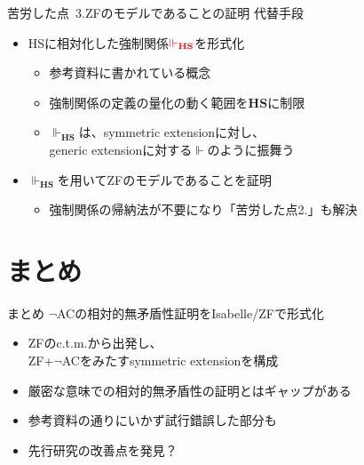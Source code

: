 \documentclass[17pt,aspectratio=169]{beamer}
\begin{document}
\begin{frame}{苦労した点\, {\normalsize 3.ZFのモデルであることの証明}}
    代替手段
    \vspace{-10pt}
    {\small
        \begin{itemize}[itemsep=8pt]
            \item HSに相対化した強制関係$\textcolor{red}{\Vdash_{\mathbf{HS}}}$を形式化
                  \begin{itemize}
                      \item 参考資料に書かれている概念
                      \item 強制関係の定義の量化の動く範囲を$\mathbf{HS}$に制限
                      \item $\Vdash_{\mathbf{HS}}$は、symmetric extensionに対し、\\
                            generic extensionに対する$\Vdash$のように振舞う
                  \end{itemize}
            \item $\Vdash_{\mathbf{HS}}$を用いてZFのモデルであることを証明
                  \begin{itemize}
                      \item 強制関係の帰納法が不要になり{\footnotesize「苦労した点2.」}も解決
                  \end{itemize}
        \end{itemize}
    }
\end{frame}


\section {まとめ}

\begin{frame}{まとめ}
    $\neg$ACの相対的無矛盾性証明をIsabelle/ZFで形式化
    {\small
    \begin{itemize}[itemsep=8pt]
        \item ZFのc.t.m.から出発し、\\ZF+$\neg$ACをみたすsymmetric extensionを構成
        \item 厳密な意味での相対的無矛盾性の証明とはギャップがある
        \item 参考資料の通りにいかず試行錯誤した部分も
        \item 先行研究の改善点を発見？
    \end{itemize}
    }
\end{frame}

\appendix
{}
\end{document}
